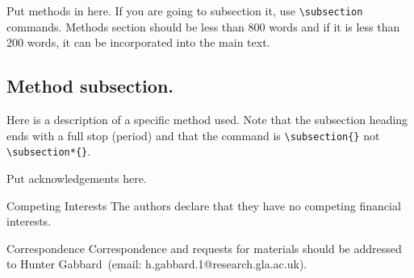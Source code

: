 \documentclass{nature}
\begin{document}
\begin{methods}
Put methods in here.  If you are going to subsection it, use
\verb|\subsection| commands.  Methods section should be less than
800 words and if it is less than 200 words, it can be incorporated
into the main text.

\subsection{Method subsection.}

Here is a description of a specific method used.  Note that the
subsection heading ends with a full stop (period) and that the
command is \verb|\subsection{}| not \verb|\subsection*{}|.

\end{methods}








\begin{addendum}
 \item Put acknowledgements here.
 \item[Competing Interests] The authors declare that they have no
competing financial interests.
 \item[Correspondence] Correspondence and requests for materials
should be addressed to Hunter Gabbard~(email: h.gabbard.1@research.gla.ac.uk).
\end{addendum}
\end{document}
